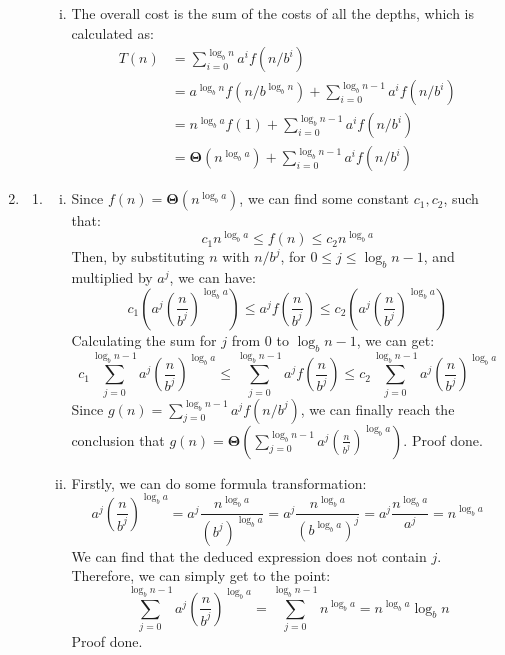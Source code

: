 \documentclass[12pt, a4paper]{article}
\begin{document}
\begin{enumerate}
\begin{enumerate}[a)]
\begin{enumerate}[i)]
            \item The overall cost is the sum of the costs of all the depths, which is calculated as:
                  \begin{align*}
                      T(n) &= \sum_{i=0}^{\log_b n} a^i f(n/b^i)\\
                           &= a^{\log_b n} f(n/b^{\log_b n}) + \sum_{i=0}^{\log_b n - 1} a^i f(n/b^i)\\
                           &= n^{\log_b a} f(1) + \sum_{i=0}^{\log_b n - 1} a^i f(n/b^i)\\
                           &= \boldsymbol{\Theta}(n^{\log_b a}) + \sum_{i=0}^{\log_b n - 1} a^i f(n/b^i)
                  \end{align*}
        \end{enumerate}
    \end{enumerate}
    
    \item \begin{enumerate}
        \item \begin{enumerate}[i)]
            \item Since $f(n) = \boldsymbol{\Theta}(n^{\log_b a})$, we can find some constant $c_1, c_2$, such that:
                  $$c_1 n^{\log_b a} \leq f(n) \leq c_2 n^{\log_b a}$$
                  Then, by substituting $n$ with $n/b^j$, for $0 \leq j \leq \log_b n - 1$, and multiplied by $a^j$, we can have:
                  $$c_1(a^j (\frac{n}{b^j})^{\log_b a}) \leq a^j f(\frac{n}{b^j}) \leq c_2(a^j (\frac{n}{b^j})^{\log_b a})$$
                  Calculating the sum for $j$ from 0 to $\log_b n - 1$, we can get:
                  $$c_1 \sum_{j=0}^{\log_b n - 1} a^j (\frac{n}{b^j})^{\log_b a} \leq \sum_{j=0}^{\log_b n - 1} a^j f(\frac{n}{b^j})
                  \leq c_2 \sum_{j=0}^{\log_b n - 1} a^j (\frac{n}{b^j})^{\log_b a}
                  $$
                  Since $g(n) = \sum_{j=0}^{\log_b n - 1} a^j f(n/b^j)$, 
                  we can finally reach the conclusion that $g(n) = \boldsymbol{\Theta}(\sum_{j=0}^{\log_b n - 1} a^j (\frac{n}{b^j})^{\log_b a})$. Proof done.
            
            \item Firstly, we can do some formula transformation:
                  $$a^j(\frac{n}{b^j})^{\log_b a} = a^j \frac{n^{\log_b a}}{(b^{j})^{\log_b a}} = a^j \frac{n^{\log_b a}}{(b^{\log_b a})^j}
                  = a^j \frac{n^{\log_b a}}{a^j} = n^{\log_b a}$$
                  We can find that the deduced expression does not contain $j$. Therefore, we can simply get to the point:
                  $$\sum_{j=0}^{\log_b n - 1} a^j (\frac{n}{b^j})^{\log_b a} = \sum_{j=0}^{\log_b n - 1} n^{\log_b a} = n^{\log_b a}\log_b n$$
                  Proof done.
            

\end{enumerate}
\end{enumerate}
\end{enumerate}
\end{document}
